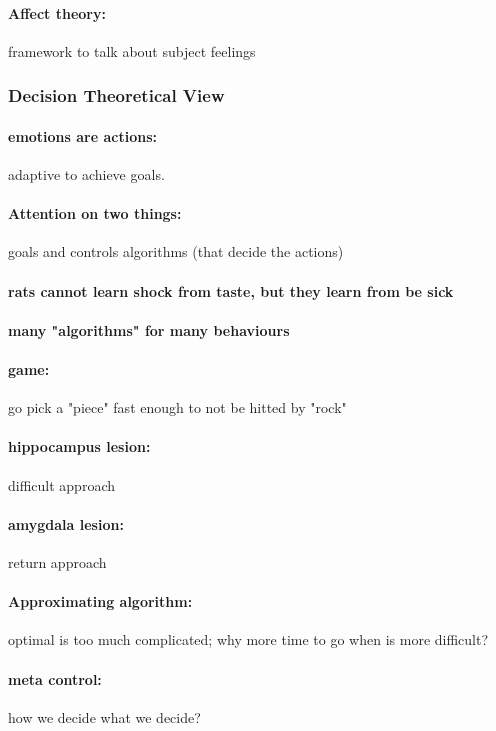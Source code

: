 \documentclass[12pt,article,oneside,a4paper]{memoir}
\begin{document}
\paragraph{Affect theory:} framework to talk about subject feelings

\subsubsection{ Decision Theoretical View}
\paragraph{emotions are actions:} adaptive to achieve goals.
\paragraph{Attention on two things:} goals and controls algorithms (that decide the actions)

\paragraph{rats cannot learn shock from taste, but they learn from be sick}

\paragraph{many "algorithms" for many behaviours}

\paragraph{game:} go pick a "piece" fast enough to not be hitted by "rock"

\paragraph{hippocampus lesion:} difficult approach
\paragraph{amygdala lesion:} return approach

\paragraph{Approximating algorithm: } optimal is too much complicated; why more time to go when is more difficult?

\paragraph{meta control:} how we decide what we decide?
\end{document}
